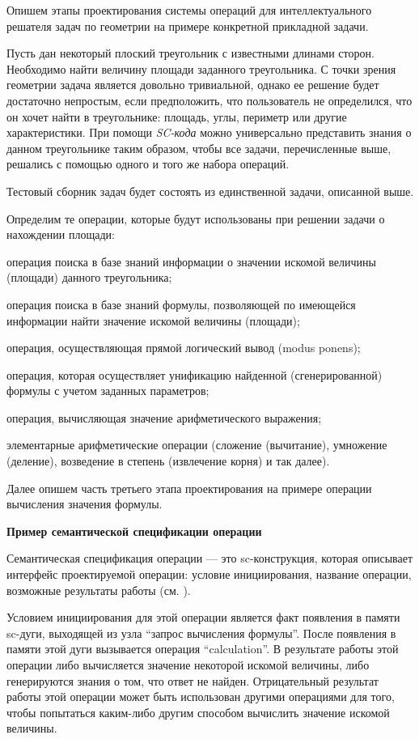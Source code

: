 Опишем этапы проектирования системы операций для интеллектуального решателя задач по геометрии на примере конкретной прикладной задачи.

Пусть дан некоторый плоский треугольник с известными длинами сторон. Необходимо найти величину площади заданного треугольника. С точки зрения геометрии задача является довольно тривиальной, однако ее решение будет достаточно непростым, если предположить, что пользователь не определился, что он хочет найти в треугольнике: площадь, углы, периметр или другие характеристики. При помощи \textit{SC-кода} можно универсально представить знания о данном треугольнике таким образом, чтобы все задачи, перечисленные выше, решались с помощью одного и того же набора операций.

Тестовый сборник задач будет состоять из единственной задачи, описанной выше.

Определим те операции, которые будут использованы при решении задачи о нахождении площади:

\begin{textitemize}
	\item операция поиска в базе знаний информации о значении искомой величины (площади) данного треугольника;
	\item операция поиска в базе знаний формулы, позволяющей по имеющейся информации найти значение искомой величины (площади);
	\item операция, осуществляющая прямой логический вывод (modus ponens);
	\item операция, которая осуществляет унификацию найденной (сгенерированной) формулы с учетом заданных параметров;
	\item операция, вычисляющая значение арифметического выражения;
	\item элементарные арифметические операции (сложение (вычитание), умножение (деление), возведение в степень (извлечение корня) и так далее).
\end{textitemize}

Далее опишем часть третьего этапа проектирования на примере операции вычисления значения формулы.

\textbf{Пример семантической спецификации операции}

Семантическая спецификация операции --- это sc-конструкция, которая описывает интерфейс проектируемой операции: условие инициирования, название операции, возможные результаты работы (см. ).

Условием инициирования для этой операции является факт появле­ния в памяти sc-дуги, выходящей из узла ``запрос вычисления формулы''. После появления в памяти этой дуги вызывается операция ``calculation''. В результате работы этой операции либо вычисляется значение некоторой искомой величины, либо генерируются знания о том, что ответ не найден. Отрицательный результат работы этой операции может быть использован другими операциями для того, чтобы попытаться каким-либо другим способом вычислить значение искомой величины.


